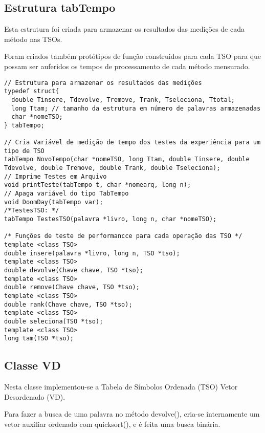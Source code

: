 \documentclass[a4paper]{article}
\begin{document}
\subsection{Estrutura tabTempo}

Esta estrutura foi criada para armazenar os resultados das medições de cada método nas TSOs.

Foram criados também protótipos de função construidos para cada TSO para que possam ser auferidos os tempos de processamento de cada método mensurado.

\begin{verbatim}
// Estrutura para armazenar os resultados das medições
typedef struct{
  double Tinsere, Tdevolve, Tremove, Trank, Tseleciona, Ttotal;
  long Ttam; // tamanho da estrutura em número de palavras armazenadas
  char *nomeTSO;
} tabTempo;

// Cria Variável de medição de tempo dos testes da experiência para um tipo de TSO
tabTempo NovoTempo(char *nomeTSO, long Ttam, double Tinsere, double Tdevolve, double Tremove, double Trank, double Tseleciona);
// Imprime Testes em Arquivo
void printTeste(tabTempo t, char *nomearq, long n);
// Apaga variável do tipo TabTempo
void DoomDay(tabTempo var);
/*TestesTSO: */
tabTempo TestesTSO(palavra *livro, long n, char *nomeTSO);

/* Funções de teste de performancce para cada operação das TSO */
template <class TSO>
double insere(palavra *livro, long n, TSO *tso);
template <class TSO>
double devolve(Chave chave, TSO *tso);
template <class TSO>
double remove(Chave chave, TSO *tso);
template <class TSO>
double rank(Chave chave, TSO *tso);
template <class TSO>
double seleciona(TSO *tso);
template <class TSO>
long tam(TSO *tso);
\end{verbatim}

\subsection{Classe VD}
\label{sec:classe-vd}

Nesta classe implementou-se a Tabela de Símbolos Ordenada (TSO) Vetor Desordenado (VD).

Para fazer a busca de uma palavra no método devolve(), cria-se internamente um vetor auxiliar ordenado com quicksort(), e é feita uma busca binária.
\end{document}
